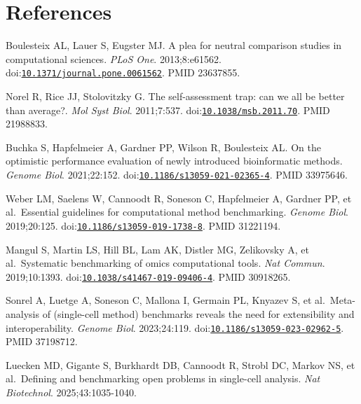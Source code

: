 \documentclass[11pt]{article}
\begin{document}
\clearpage
\section{References}\label{references}

\begingroup\small{}
\begin{enumerate}[label={[\arabic*]},leftmargin=2.6em,labelsep=0.5em,itemsep=1.5pt]
\item
  Boulesteix AL, Lauer S, Eugster MJ. A plea for neutral comparison
  studies in computational sciences. \emph{PLoS One}. 2013;8:e61562.
  doi:\href{https://doi.org/10.1371/journal.pone.0061562}{\nolinkurl{10.1371/journal.pone.0061562}}.
  PMID 23637855.
\item
  Norel R, Rice JJ, Stolovitzky G. The self-assessment trap: can we all
  be better than average?. \emph{Mol Syst Biol}. 2011;7:537.
  doi:\href{https://doi.org/10.1038/msb.2011.70}{\nolinkurl{10.1038/msb.2011.70}}.
  PMID 21988833.
\item
  Buchka S, Hapfelmeier A, Gardner PP, Wilson R, Boulesteix AL. On the
  optimistic performance evaluation of newly introduced bioinformatic
  methods. \emph{Genome Biol}. 2021;22:152.
  doi:\href{https://doi.org/10.1186/s13059-021-02365-4}{\nolinkurl{10.1186/s13059-021-02365-4}}.
  PMID 33975646.
\item
  Weber LM, Saelens W, Cannoodt R, Soneson C, Hapfelmeier A, Gardner PP,
  et al.~Essential guidelines for computational method benchmarking.
  \emph{Genome Biol}. 2019;20:125.
  doi:\href{https://doi.org/10.1186/s13059-019-1738-8}{\nolinkurl{10.1186/s13059-019-1738-8}}.
  PMID 31221194.
\item
  Mangul S, Martin LS, Hill BL, Lam AK, Distler MG, Zelikovsky A, et
  al.~Systematic benchmarking of omics computational tools. \emph{Nat
  Commun}. 2019;10:1393.
  doi:\href{https://doi.org/10.1038/s41467-019-09406-4}{\nolinkurl{10.1038/s41467-019-09406-4}}.
  PMID 30918265.
\item
  Sonrel A, Luetge A, Soneson C, Mallona I, Germain PL, Knyazev S, et
  al.~Meta-analysis of (single-cell method) benchmarks reveals the need
  for extensibility and interoperability. \emph{Genome Biol}.
  2023;24:119.
  doi:\href{https://doi.org/10.1186/s13059-023-02962-5}{\nolinkurl{10.1186/s13059-023-02962-5}}.
  PMID 37198712.
\item
  Luecken MD, Gigante S, Burkhardt DB, Cannoodt R, Strobl DC, Markov NS,
  et al.~Defining and benchmarking open problems in single-cell
  analysis. \emph{Nat Biotechnol}. 2025;43:1035-1040.

\end{enumerate}
\end{document}
